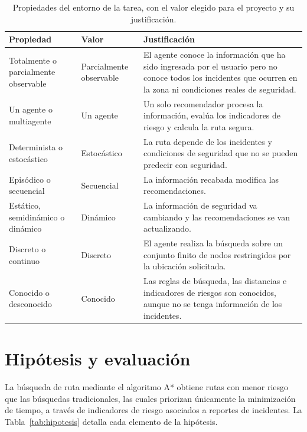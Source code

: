 \documentclass[11pt]{article}
\begin{document}
\begin{table}[H]
  \caption{Propiedades del entorno de la tarea, con el valor elegido para el proyecto y su
    justificación.}
  \label{tab:propiedades}
  \small
  \renewcommand{\arraystretch}{1.25}
  \begin{tabularx}{\textwidth}{@{}p{}L{0.15\textwidth}X@{}}
    \toprule
    Propiedad & Valor & Justificación \\
    \midrule
    Totalmente o parcialmente observable & Parcialmente observable & El agente conoce la
      información que ha sido ingresada por el usuario pero no conoce todos los incidentes que
      ocurren en la zona ni condiciones reales de seguridad. \\
    Un agente o multiagente & Un agente & Un solo recomendador procesa la información, evalúa los
      indicadores de riesgo y calcula la ruta segura. \\
    Determinista o estocástico & Estocástico & La ruta depende de los incidentes y condiciones de
      seguridad que no se pueden predecir con seguridad. \\
    Episódico o secuencial & Secuencial & La información recabada modifica las
      recomendaciones. \\
    Estático, semidinámico o dinámico & Dinámico & La información de seguridad va cambiando y las
      recomendaciones se van actualizando. \\
    Discreto o continuo & Discreto & El agente realiza la búsqueda sobre un conjunto finito de
      nodos restringidos por la ubicación solicitada. \\
    Conocido o desconocido & Conocido & Las reglas de búsqueda, las distancias e indicadores de
      riesgos son conocidos, aunque no se tenga información de los incidentes. \\
    \bottomrule
  \end{tabularx}
\end{table}

\section{Hipótesis y evaluación}
\label{sec:hipotesis}

La búsqueda de ruta mediante el algoritmo A* obtiene rutas con menor riesgo que las búsquedas
tradicionales, las cuales priorizan únicamente la minimización de tiempo, a través de indicadores de
riesgo asociados a reportes de incidentes. La Tabla~\ref{tab:hipotesis} detalla cada elemento de la
hipótesis.
\end{document}
